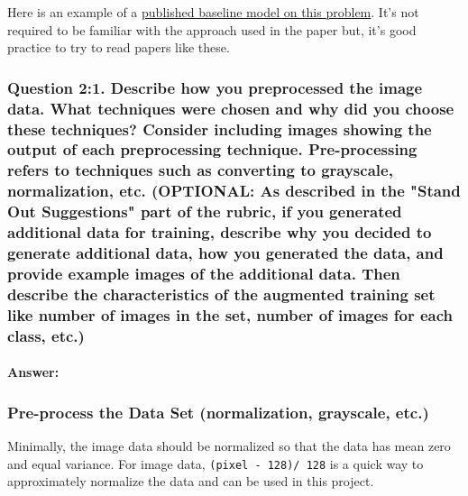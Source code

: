 \documentclass[11pt]{article}
\begin{document}
Here is an example of a
\href{http://yann.lecun.com/exdb/publis/pdf/sermanet-ijcnn-11.pdf}{published
baseline model on this problem}. It's not required to be familiar with
the approach used in the paper but, it's good practice to try to read
papers like these.

    \subsubsection{Question 2:1. Describe how you preprocessed the image
data. What techniques were chosen and why did you choose these
techniques? Consider including images showing the output of each
preprocessing technique. Pre-processing refers to techniques such as
converting to grayscale, normalization, etc. (OPTIONAL: As described in
the "Stand Out Suggestions" part of the rubric, if you generated
additional data for training, describe why you decided to generate
additional data, how you generated the data, and provide example images
of the additional data. Then describe the characteristics of the
augmented training set like number of images in the set, number of
images for each class,
etc.)}\label{question-21.-describe-how-you-preprocessed-the-image-data.-what-techniques-were-chosen-and-why-did-you-choose-these-techniques-consider-including-images-showing-the-output-of-each-preprocessing-technique.-pre-processing-refers-to-techniques-such-as-converting-to-grayscale-normalization-etc.-optional-as-described-in-the-stand-out-suggestions-part-of-the-rubric-if-you-generated-additional-data-for-training-describe-why-you-decided-to-generate-additional-data-how-you-generated-the-data-and-provide-example-images-of-the-additional-data.-then-describe-the-characteristics-of-the-augmented-training-set-like-number-of-images-in-the-set-number-of-images-for-each-class-etc.}

    \paragraph{Answer:}\label{answer}

    \subsubsection{Pre-process the Data Set (normalization, grayscale,
etc.)}\label{pre-process-the-data-set-normalization-grayscale-etc.}

    Minimally, the image data should be normalized so that the data has mean
zero and equal variance. For image data, \texttt{(pixel\ -\ 128)/\ 128}
is a quick way to approximately normalize the data and can be used in
this project.
\end{document}
